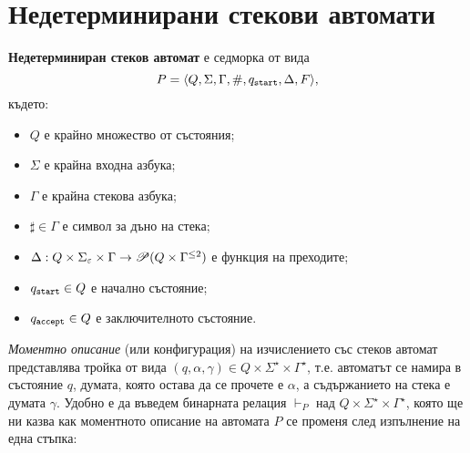 \section{Недетерминирани стекови автомати}

{\bf Недетерминиран стеков автомат} е седморка от вида
\[P = \PDA,\] където:
\begin{itemize}
\item
  $Q$ е крайно множество от състояния;
\item  
  $\Sigma$ е крайна входна азбука;
\item
  $\Gamma$ е крайна стекова азбука;
\item
  $\sharp \in \Gamma$ е символ за дъно на стека;
\item
  $\Delta:Q\times\Sigma_\varepsilon\times \Gamma \rightarrow \Ps(Q\times\Gamma^{\leq 2})$ 
  е функция на преходите;    
\item
  $\qstart \in Q$ е начално състояние;
\item
  $\qaccept \in Q$ е заключителното състояние.
\end{itemize}

{\em Моментно описание} (или конфигурация) на изчислението със стеков автомат представлява тройка от вида $(q,\alpha,\gamma) \in Q\times\Sigma^\star\times\Gamma^\star$,
т.е. автоматът се намира в състояние $q$, думата, която остава да се прочете е $\alpha$,
а съдържанието на стека е думата $\gamma$.
Удобно е да въведем бинарната релация $\vdash_P$ над $Q\times\Sigma^\star\times\Gamma^\star$,
която ще ни казва как моментното описание на автомата $P$ се променя след изпълнение на една стъпка:

\begin{prooftree}
\end{prooftree}

\begin{prooftree}
\end{prooftree}



